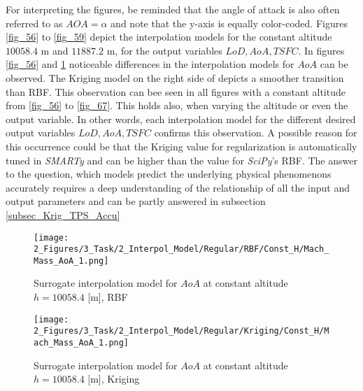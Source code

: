 For interpreting the figures, be reminded that the angle 
of attack is also often referred to as $AOA = \alpha$
and note that the y-axis is equally color-coded.
Figures \ref{fig_56} to \ref{fig_59} depict 
the interpolation models for the constant
altitude $10058.4$ m  and $11887.2$ m, for 
the output variables $LoD, AoA, TSFC$.
In figures \ref{fig_56} and \ref{fig_57} 
noticeable differences in the interpolation 
models for $AoA$ can be observed. The Kriging 
model on the right side of depicts a 
smoother transition than RBF. This observation 
can bee seen in all figures 
with a constant altitude from \ref{fig_56}
to \ref{fig_67}. This holds also, when varying 
the altitude or even the output variable.
In other words, each interpolation 
model for the different desired 
output variables $LoD, AoA, TSFC$ 
confirms this observation. A possible 
reason for this occurrence could be that the
Kriging value for 
regularization is automatically tuned in \emph{SMARTy} and can 
be higher 
than the value for \emph{SciPy}'s RBF.
The answer to the 
question, which models predict the underlying 
physical phenomenons accurately requires a deep understanding 
of the relationship of all the input and output 
parameters and can be partly answered in 
subsection \ref{subsec_Krig_TPS_Accu}\newline

\begin{figure}[!h]
    \begin{minipage}[h]{0.46\textwidth}
        \centering
        \texttt{[image: 2\_Figures/3\_Task/2\_Interpol\_Model/Regular/RBF/Const\_H/Mach\_Mass\_AoA\_1.png]}
        \caption{Surrogate interpolation model for $AoA$ at constant altitude $h = 10058.4$ [m], RBF}
        \label{fig_56}    
    \end{minipage}
    \hfill
    \begin{minipage}{0.46\textwidth}
        \centering
        \texttt{[image: 2\_Figures/3\_Task/2\_Interpol\_Model/Regular/Kriging/Const\_H/Mach\_Mass\_AoA\_1.png]}
        \caption{Surrogate interpolation model for $AoA$ at constant altitude $h = 10058.4$ [m], Kriging}
        \label{fig_57}    
    \end{minipage}
\end{figure} 

